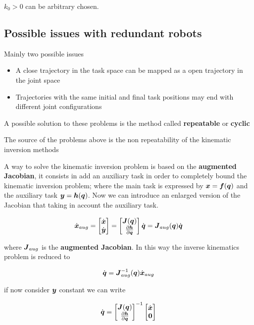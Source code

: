 $k_0 > 0$ can be arbitrary chosen. 

\subsection{Possible issues with redundant robots}

Mainly two possible issues

\begin{itemize}
	\item A close trajectory in the task space can be mapped as a open trajectory in the joint space
	\item Trajectories with the same initial and final task positions may end with different joint configurations
\end{itemize}

A possible solution to these problems is the method called \textbf{repeatable} or \textbf{cyclic}

The source of the problems above is the non repeatability of the kinematic inversion methods

A way to solve the kinematic inversion problem is based on the \textbf{augmented Jacobian}, it consists in add an auxiliary task in order to completely bound the kinematic inversion problem;
where the main task is expressed by $\boldsymbol{x}=\boldsymbol{f}(\boldsymbol{q})$ and the auxiliary task $\boldsymbol{y}=\boldsymbol{h}(\boldsymbol{q})$.
Now we can introduce an enlarged version of the Jacobian that taking in account the auxiliary task.

\[
	\dot{\boldsymbol{x}}_{aug} =
	\begin{bmatrix}\dot{\boldsymbol{x}}\\\dot{\boldsymbol{y}}\end{bmatrix} =
	\begin{bmatrix} \boldsymbol{J}(\boldsymbol{q}) \\ \frac{\partial\boldsymbol{h}}{\partial\boldsymbol{q}} \end{bmatrix} \dot{\boldsymbol{q}} =
	\boldsymbol{J}_{aug}(\boldsymbol{q})\dot{\boldsymbol{q}}
\]

where $\boldsymbol{J}_{aug}$ is the \textbf{augmented Jacobian}.
In this way the inverse kinematics problem is reduced to

\[
	\dot{\boldsymbol{q}} = \boldsymbol{J}_{aug}^{-1}(\boldsymbol{q}) \dot{\boldsymbol{x}}_{aug}
\]

if now consider $\boldsymbol{y}$ constant we can write

\[
	\dot{\boldsymbol{q}} = \begin{bmatrix} \boldsymbol{J}(\boldsymbol{q}) \\ \frac{\partial\boldsymbol{h}}{\partial\boldsymbol{q}} \end{bmatrix}^{-1} \begin{bmatrix}\dot{\boldsymbol{x}}\\\boldsymbol{0}\end{bmatrix}
\]

